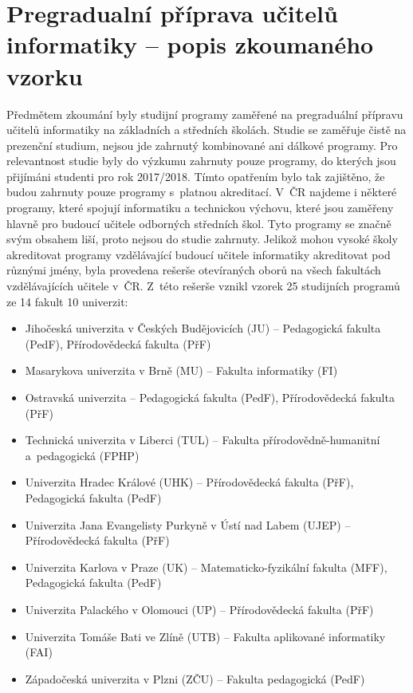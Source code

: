 \documentclass[FP,DP]{tulthesis}
\begin{document}
{{{{{{{\section{Pregradualní příprava učitelů informatiky -- popis zkoumaného vzorku}
Předmětem zkoumání byly studijní programy zaměřené na pregraduální přípravu učitelů informatiky na základních a středních školách. Studie se zaměřuje čistě na prezenční studium, nejsou jde zahrnutý kombinované ani dálkové programy. Pro relevantnost studie byly do výzkumu zahrnuty pouze programy, do kterých jsou přijímáni studenti pro rok 2017/2018. Tímto opatřením bylo tak zajištěno, že budou zahrnuty pouze programy s~platnou akreditací. V~ČR najdeme i některé programy, které spojují informatiku a technickou výchovu, které jsou zaměřeny hlavně pro budoucí učitele odborných středních škol. Tyto programy se značně svým obsahem liší, proto nejsou do studie zahrnuty.
Jelikož mohou vysoké školy akreditovat programy vzdělávající budoucí učitele informatiky akreditovat pod různými jmény, byla provedena rešerše otevíraných oborů na všech fakultách vzdělávajících učitele v~ČR. Z~této rešerše vznikl vzorek 25 studijních programů ze 14 fakult 10 univerzit:
\begin{itemize}
\setlength\itemsep{0.2em}
\item Jihočeská univerzita v Českých Budějovicích (JU) -- Pedagogická fakulta (PedF), Přírodovědecká fakulta (PřF)
\item Masarykova univerzita v Brně (MU) -- Fakulta informatiky (FI)
\item Ostravská univerzita -- Pedagogická fakulta (PedF), Přírodovědecká fakulta (PřF)
\item Technická univerzita v Liberci (TUL) -- Fakulta 	přírodovědně-humanitní a~pedagogická (FPHP)
\item Univerzita Hradec Králové (UHK) -- Přírodovědecká fakulta (PřF), Pedagogická fakulta (PedF)
\item Univerzita Jana Evangelisty Purkyně v Ústí nad Labem (UJEP) -- Přírodovědecká fakulta (PřF)
\item Univerzita Karlova v Praze (UK) -- Matematicko-fyzikální fakulta (MFF), Pedagogická fakulta (PedF)
\item Univerzita Palackého v Olomouci (UP) -- Přírodovědecká fakulta (PřF)
\item Univerzita Tomáše Bati ve Zlíně (UTB) -- Fakulta aplikované informatiky (FAI)
\item Západočeská univerzita v Plzni (ZČU) -- Fakulta pedagogická (PedF)
\end{itemize}


}}}}}}}
\end{document}
